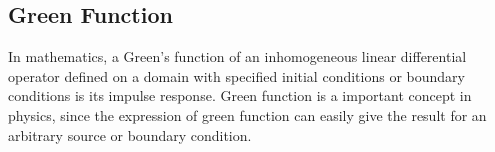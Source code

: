 %
%

\subsection{Green Function} \label{mathrefs}

In mathematics, a Green's function of an inhomogeneous linear differential operator defined on a domain with specified initial conditions or boundary conditions is its impulse response.
Green function is a important concept in physics, since the expression of green function can easily give the result for an arbitrary source or boundary condition.


